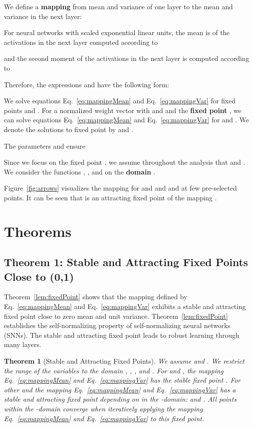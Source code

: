 \documentclass{article}
\newtheorem{theorem}{Theorem}
\begin{document}
We define a {\bf mapping } from mean  and
variance  of one layer 
to the mean  and  variance   in the next layer:

For neural networks with scaled exponential linear units, 
the mean is of the activations in the next layer computed according to

and the second moment of the activations in the next layer is computed according to


Therefore, the expressions  and  have the following form: 



We solve equations Eq.~\ref{eq:mappingMean} and
Eq.~\ref{eq:mappingVar} for fixed points  and . 
For a normalized weight vector with  and  and the
{\bf fixed point },
 we can solve equations Eq.~\ref{eq:mappingMean} and 
Eq.~\ref{eq:mappingVar} for  and .
We denote the solutions to fixed point 
by   and .

The parameters  and  ensure 




Since we focus on the fixed point  ,
we assume throughout the analysis that  and .
We consider the functions , 
, 
and  
on the {\bf domain} 
.

Figure~\ref{fig:arrows} visualizes 
the mapping  for  and  and 
 and  at few pre-selected points.
It can be seen that  is an attracting 
fixed point of the mapping .






\section{Theorems}
\subsection{Theorem 1: Stable and Attracting Fixed Points Close to (0,1)}

Theorem~\ref{lem:fixedPoint}
shows that the mapping  defined by Eq.~\eqref{eq:mappingMean}
and Eq.~\eqref{eq:mappingVar} 
exhibits a stable and attracting fixed point close to zero mean and
unit variance. 
Theorem~\ref{lem:fixedPoint} establishes the self-normalizing property of self-normalizing
neural networks (SNNs). The stable and
attracting fixed point leads to robust learning through many layers.

\begin{theorem}[Stable and Attracting Fixed Points]
We assume  and .
We restrict the range of the variables to the domain 
,
,
, and
.
For  and , the mapping  Eq.~\eqref{eq:mappingMean}
and Eq.~\eqref{eq:mappingVar} has the stable
fixed point .
For other  and  the mapping  Eq.~\eqref{eq:mappingMean}
and Eq.~\eqref{eq:mappingVar}  has a stable and
attracting fixed point depending on  in the 
-domain:  and 
.
All points within the -domain converge when
iteratively applying the mapping  Eq.~\eqref{eq:mappingMean}
and Eq.~\eqref{eq:mappingVar} to this fixed point.
\end{theorem}
\end{document}
